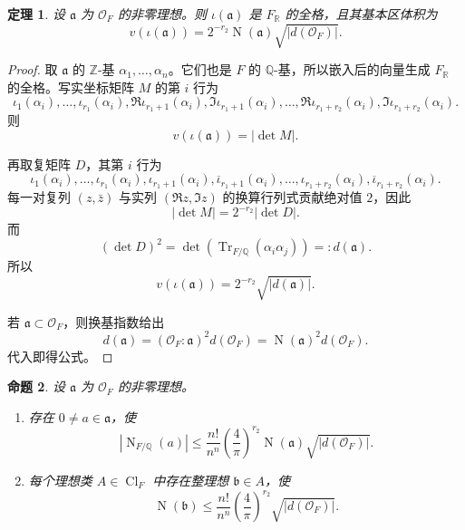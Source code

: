 \documentclass[11pt,a4paper,openany]{ctexbook}
\numberwithin{equation}{chapter}
\newcommand{\Q}{\mathbb{Q}}
\newcommand{\R}{\mathbb{R}}
\newcommand{\Z}{\mathbb{Z}}
\newcommand{\OF}{\mathcal{O}_F}
\newcommand{\Tr}{\operatorname{Tr}}
\newcommand{\Nm}{\operatorname{N}}
\newcommand{\Cl}{\operatorname{Cl}}
\theoremstyle{plain}
\newtheorem{theorem}{定理}[chapter]
\newtheorem{proposition}[theorem]{命题}
\theoremstyle{definition}
\theoremstyle{remark}
\begin{document}
\begin{theorem}
设 $\mathfrak a$ 为 $\OF$ 的非零理想。则 $\iota(\mathfrak a)$ 是 $F_\R$ 的全格，且其基本区体积为
\[
v(\iota(\mathfrak a))
=2^{-r_2}\Nm(\mathfrak a)\sqrt{|d(\OF)|}.
\]
\end{theorem}

\begin{proof}
取 $\mathfrak a$ 的 $\Z$-基 $\alpha_1,\dots,\alpha_n$。它们也是 $F$ 的 $\Q$-基，所以嵌入后的向量生成 $F_\R$ 的全格。写实坐标矩阵 $M$ 的第 $i$ 行为
\[
\iota_1(\alpha_i),\dots,\iota_{r_1}(\alpha_i),
\Re\iota_{r_1+1}(\alpha_i),\Im\iota_{r_1+1}(\alpha_i),\dots,
\Re\iota_{r_1+r_2}(\alpha_i),\Im\iota_{r_1+r_2}(\alpha_i).
\]
则
\[
v(\iota(\mathfrak a))=|\det M|.
\]

再取复矩阵 $D$，其第 $i$ 行为
\[
\iota_1(\alpha_i),\dots,\iota_{r_1}(\alpha_i),
\iota_{r_1+1}(\alpha_i),\overline{\iota}_{r_1+1}(\alpha_i),\dots,
\iota_{r_1+r_2}(\alpha_i),\overline{\iota}_{r_1+r_2}(\alpha_i).
\]
每一对复列 $(z,\bar z)$ 与实列 $(\Re z,\Im z)$ 的换算行列式贡献绝对值 $2$，因此
\[
|\det M|=2^{-r_2}|\det D|.
\]
而
\[
(\det D)^2=\det(\Tr_{F/\Q}(\alpha_i\alpha_j))=:d(\mathfrak a).
\]
所以
\[
v(\iota(\mathfrak a))=2^{-r_2}\sqrt{|d(\mathfrak a)|}.
\]

若 $\mathfrak a\subset\OF$，则换基指数给出
\[
d(\mathfrak a)=(\OF:\mathfrak a)^2d(\OF)
=\Nm(\mathfrak a)^2d(\OF).
\]
代入即得公式。
\end{proof}

\begin{proposition}
设 $\mathfrak a$ 为 $\OF$ 的非零理想。
\begin{enumerate}[label=(\arabic*)]
\item 存在 $0\ne a\in\mathfrak a$，使
\[
|\Nm_{F/\Q}(a)|
\le
\frac{n!}{n^n}\left(\frac4\pi\right)^{r_2}
\Nm(\mathfrak a)\sqrt{|d(\OF)|}.
\]
\item 每个理想类 $A\in\Cl_F$ 中存在整理想 $\mathfrak b\in A$，使
\[
\Nm(\mathfrak b)
\le
\frac{n!}{n^n}\left(\frac4\pi\right)^{r_2}
\sqrt{|d(\OF)|}.
\]
\end{enumerate}
\end{proposition}
\end{document}
